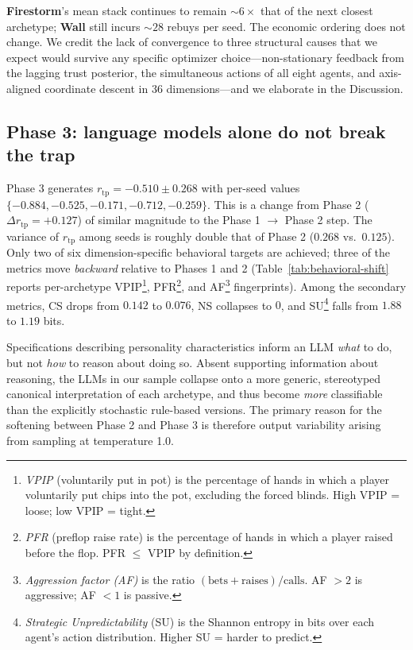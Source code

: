 \documentclass[10pt,twocolumn,letterpaper]{article}
\newcommand{\arch}[1]{\textbf{#1}}
\newcommand{\rtp}{\ensuremath{r_{\mathrm{tp}}}}
\begin{document}
\arch{Firestorm}'s mean stack continues to remain ${\sim}6{\times}$
that of the next closest archetype; \arch{Wall} still incurs
${\sim}28$ rebuys per seed. The economic ordering does not change.
We credit the lack of convergence to three structural causes that
we expect would survive any specific optimizer choice---non-stationary
feedback from the lagging trust posterior, the simultaneous actions
of all eight agents, and axis-aligned coordinate descent in 36
dimensions---and we elaborate in the Discussion.


\subsection{Phase 3: language models alone do not break the trap}

Phase 3 generates $\rtp = -0.510 \pm 0.268$ with per-seed values
$\{-0.884, -0.525, -0.171, -0.712, -0.259\}$. This is a change from
Phase 2 ($\Delta\rtp = +0.127$) of similar magnitude to the
Phase 1 $\to$ Phase 2 step. The variance of $\rtp$ among seeds is
roughly double that of Phase 2 ($0.268$ vs.\ $0.125$). Only two of
six dimension-specific behavioral targets are achieved; three of the
metrics move \textit{backward} relative to
Phases 1 and 2 (Table~\ref{tab:behavioral-shift} reports
per-archetype VPIP\footnote{\textit{VPIP} (voluntarily put in
pot) is the percentage of hands in which a player voluntarily
put chips into the pot, excluding the forced blinds. High VPIP =
loose; low VPIP = tight.},
PFR\footnote{\textit{PFR} (preflop raise rate) is the percentage
of hands in which a player raised before the flop. PFR $\le$
VPIP by definition.}, and
AF\footnote{\textit{Aggression factor (AF)} is the ratio
$(\text{bets}+\text{raises})/\text{calls}$. AF $>2$ is
aggressive; AF $<1$ is passive.} fingerprints). Among the secondary
metrics, CS drops from $0.142$ to $0.076$, NS collapses to $0$, and
SU\footnote{\textit{Strategic Unpredictability} (SU) is the
Shannon entropy \citep{shannon1948mathematical} in bits over each
agent's action distribution.
Higher SU = harder to predict.} falls from $1.88$ to $1.19$
bits.



Specifications describing personality characteristics inform an LLM
\textit{what} to do, but not \textit{how} to reason about doing so.
Absent supporting information about reasoning, the LLMs in our sample
collapse onto a more generic, stereotyped canonical interpretation
of each archetype, and thus become \textit{more} classifiable than
the explicitly stochastic rule-based versions. The primary reason
for the softening between Phase 2 and Phase 3 is therefore output
variability arising from sampling at temperature 1.0.
\end{document}
